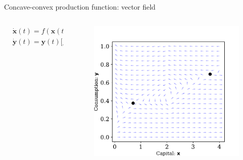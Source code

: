 \documentclass[aspectratio=169,10pt]{beamer}
\begin{document}
\begin{frame}{Concave-convex production function: vector field}
	\begin{columns}
		\begin{column}{0.5\textwidth}
			\begin{align*}
				&\dot{\mathbf{x}}(t) = f(\mathbf{x}(t)) - \mathbf{y}(t)-\delta \mathbf{x}(t)\\
				&\dot{\mathbf{y}}(t) = \mathbf{y}(t)\big[f'(\mathbf{x}(t)) -\delta -r\big]
			\end{align*}
		\end{column}
		\begin{column}{0.5\textwidth}
			\begin{figure}[t!]
				\centering
				\includegraphics[width=\textwidth]{figs/vec_field_con_con.pdf}
				\vspace{-4mm}
			\end{figure}
		\end{column}
	\end{columns}
\end{frame}
\end{document}
